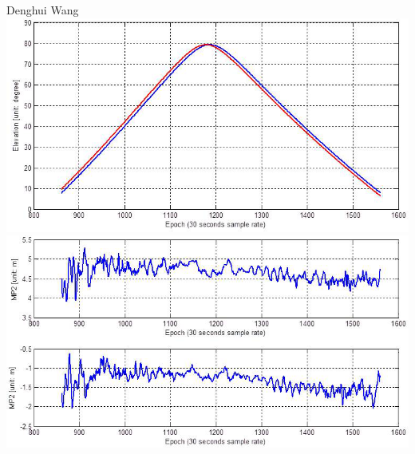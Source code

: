 \documentclass[11pt]{beamer}
\begin{document}
\begin{frame}{Denghui Wang}%
	\centering
	\includegraphics[height=.35\textheight]{pic/DW_reporbits.png}
	\includegraphics[height=.4\textheight]{pic/DW_mp.png} 
\end{frame}
\end{document}
